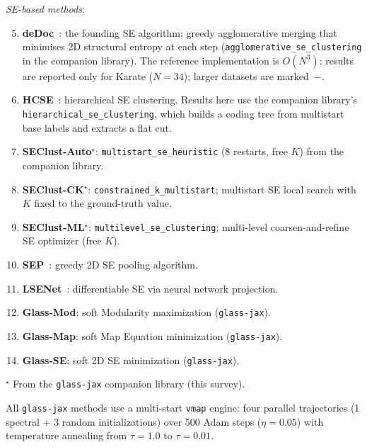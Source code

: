 \textit{SE-based methods}:
\begin{enumerate}\setcounter{enumi}{4}
  \item \textbf{deDoc}~\cite{li2018dedoc}: the founding SE algorithm;
        greedy agglomerative merging that minimises 2D structural entropy
        at each step (\texttt{agglomerative\_se\_clustering} in the companion
        library). The reference implementation is $O(N^3)$; results are
        reported only for Karate ($N{=}34$); larger datasets are marked~$-$.
  \item \textbf{HCSE}~\cite{pan2021information}: hierarchical SE clustering.
        Results here use the companion library's
        \texttt{hierarchical\_se\_clustering}, which builds a coding tree
        from multistart base labels and extracts a flat cut.
  \item \textbf{SEClust-Auto}$^\star$: \texttt{multistart\_se\_heuristic}
        (8 restarts, free $K$) from the companion library.
  \item \textbf{SEClust-CK}$^\star$: \texttt{constrained\_k\_multistart};
        multistart SE local search with $K$ fixed to the ground-truth value.
  \item \textbf{SEClust-ML}$^\star$: \texttt{multilevel\_se\_clustering};
        multi-level coarsen-and-refine SE optimizer (free $K$).
  \item \textbf{SEP}~\cite{wu2022pooling}: greedy 2D SE pooling algorithm.
  \item \textbf{LSENet}~\cite{sun2024lsenet}: differentiable SE via neural
        network projection.
  \item \textbf{Glass-Mod}: soft Modularity maximization (\texttt{glass-jax}).
  \item \textbf{Glass-Map}: soft Map Equation minimization (\texttt{glass-jax}).
  \item \textbf{Glass-SE}: soft 2D SE minimization (\texttt{glass-jax}).
\end{enumerate}

$^\star$ From the \texttt{glass-jax} companion library (this survey).

All \texttt{glass-jax} methods use a multi-start \texttt{vmap} engine: four
parallel trajectories (1 spectral + 3 random initializations) over 500 Adam
steps ($\eta=0.05$) with temperature annealing from $\tau=1.0$ to $\tau=0.01$.

